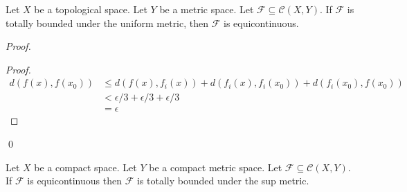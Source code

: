 \begin{lemma}
    \label{lemma:totally_bounded_equicontinuous}
    Let $X$ be a topological space. Let $Y$ be a metric space. Let $\mathcal{F} \subseteq \mathcal{C}(X,Y)$. If $\mathcal{F}$
    is totally bounded under the uniform metric, then $\mathcal{F}$ is equicontinuous.
\end{lemma}

\begin{proof}
    \pf
    \begin{proof}
        \pf
        \begin{align*}
            d(f(x),f(x_0)) & \leq d(f(x),f_i(x)) + d(f_i(x),f_i(x_0)) + d(f_i(x_0),f(x_0)) \\
            & < \epsilon / 3 + \epsilon / 3 + \epsilon / 3 \\
            & = \epsilon
        \end{align*}
    \end{proof}
    \qed
\end{proof}

\begin{lemma}[Choice]
    \label{lemma:equicontinuous_totally_bounded}
    Let $X$ be a compact space. Let $Y$ be a compact metric space. Let $\mathcal{F} \subseteq \mathcal{C}(X,Y)$. If $\mathcal{F}$
    is equicontinuous then $\mathcal{F}$ is totally bounded under the sup metric.
\end{lemma}

